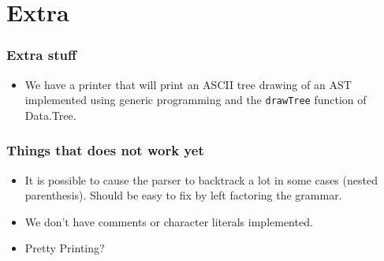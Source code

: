 \documentclass{beamer}
\begin{document}
\section{Extra}
\begin{frame}
\frametitle{Extra stuff}
\begin{itemize}
\item We have a printer that will print an ASCII tree drawing of an AST implemented using generic programming and the \lstinline{drawTree} function of Data.Tree.
\end{itemize}
\end{frame}
\begin{frame}
\frametitle{Things that does not work yet}
\begin{itemize}
\item It is possible to cause the parser to backtrack a lot in some cases (nested parenthesis). Should be easy to fix by left factoring the grammar.
\item We don't have comments or character literals implemented.
\item Pretty Printing?
\end{itemize}
\end{frame}
\end{document}
